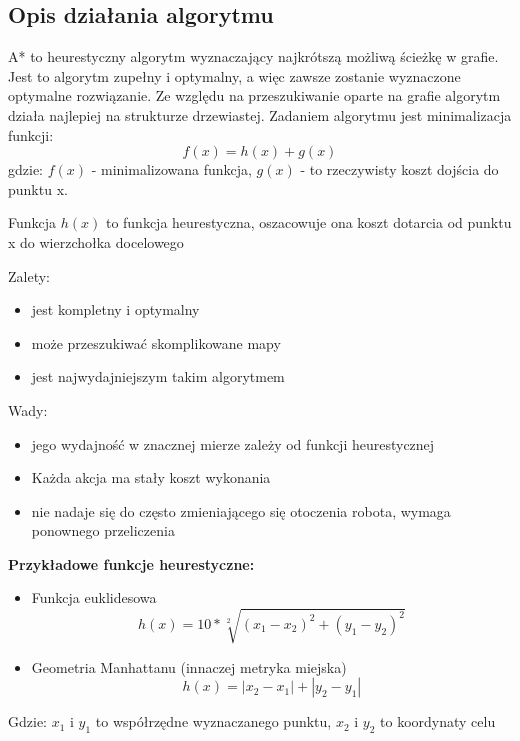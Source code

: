 \subsection{Opis działania algorytmu}

A* to heurestyczny algorytm wyznaczający najkrótszą możliwą ścieżkę w grafie. 
Jest to algorytm zupełny i optymalny, a więc zawsze zostanie wyznaczone optymalne 
rozwiązanie. Ze względu na przeszukiwanie oparte na grafie algorytm działa najlepiej na strukturze drzewiastej.
Zadaniem algorytmu jest minimalizacja funkcji:
\begin{equation}
	f(x)=h(x) + g(x)
	\label{Eq:funkcjaKosztuAStar}
\end{equation}
gdzie: $f(x)$ - minimalizowana funkcja, $g(x)$ - to rzeczywisty koszt dojścia do punktu x.

Funkcja $h(x)$ to funkcja heurestyczna, oszacowuje ona koszt dotarcia od punktu x do wierzchołka docelowego

Zalety:
\begin{itemize}
	\item jest kompletny i optymalny
	\item może przeszukiwać skomplikowane mapy
	\item jest najwydajniejszym takim algorytmem
\end{itemize}
Wady:
\begin{itemize}
	\item jego wydajność w znacznej mierze zależy od funkcji heurestycznej
	\item Każda akcja ma stały koszt wykonania
	\item nie nadaje się do często zmieniającego się otoczenia robota, wymaga ponownego przeliczenia
\end{itemize}


\textbf{Przykładowe funkcje heurestyczne:}
\begin{itemize}
	\item Funkcja euklidesowa
	      \begin{equation}
	      	h(x)= 10 * \sqrt[2]{(x_1 - x_2)^2 + (y_1 - y_2)^2}
	      	\label{Eq:heuresticEucalides}
	      \end{equation}
	\item Geometria Manhattanu (innaczej metryka miejska)
	      \begin{equation}
	      	h(x)= |x_2 - x_1| + |y_2 - y_1|
	      	\label{Eq:heuresticManhattanu}
	      \end{equation}
\end{itemize}
Gdzie: $x_1$ i $y_1$ to współrzędne wyznaczanego punktu, $x_2$ i $y_2$ to koordynaty celu


